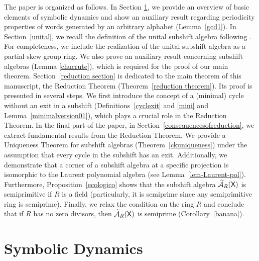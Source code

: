 \documentclass[a4paper,12pt]{amsart}
\theoremstyle{definition}
\theoremstyle{remark}
\numberwithin{equation}{section}
\newcommand{\osf}{{\normalfont \textsf{X}}}
\newcommand{\ualgshift}{\TCA_R(\osf)}
\newcommand{\CA}{\mathcal{A}}
\newcommand{\TCA}{\widetilde{\CA}}
\begin{document}
The paper is organized as follows. In Section \ref{eleicoes}, we provide an overview of basic elements of symbolic dynamics and show an auxiliary result regarding periodicity properties of words generated by an arbitrary alphabet (Lemma~\ref{gcd1}). In Section~\ref{unital}, we recall the definition of the unital subshift algebra following \cite{BGGV}. For completeness, we include the realization of the unital subshift algebra as a partial skew group ring. We also prove an auxiliary result concerning subshift algebras (Lemma \ref{chucrute}), which is required for the proof of our main theorem. Section~\ref{reduction section} is dedicated to the main theorem of this manuscript, the Reduction Theorem (Theorem~\ref{reduction theorem}). Its proof is presented in several steps. We first introduce the concept of a (minimal) cycle without an exit in a subshift (Definitions~\ref{cyclexit} and \ref{mini} and Lemma~\ref{minimalversion01}), which plays a crucial role in the Reduction Theorem. In the final part of the paper, in Section~\ref{consequencesofreduction}, we extract fundamental results from the Reduction Theorem. We provide a Uniqueness Theorem for subshift algebras (Theorem~\ref{ckuniqueness}) under the assumption that every cycle in the subshift has an exit. Additionally, we demonstrate that a corner of a subshift algebra at a specific projection is isomorphic to the Laurent polynomial algebra (see Lemma~\ref{lem-Laurent-pol}). Furthermore, Proposition~\ref{ecologico} shows that the subshift algebra $\ualgshift$ is semiprimitive if $R$ is a field (particularly, it is semiprime since any semiprimitive ring is semiprime). Finally, we relax the condition on the ring $R$ and conclude that if $R$ has no zero divisors, then $\ualgshift$ is semiprime (Corollary~\ref{banana}).

\section{Symbolic Dynamics}\label{eleicoes}
\end{document}
